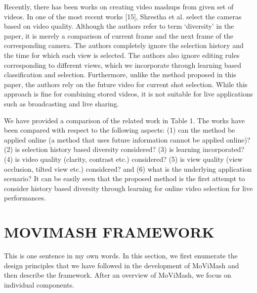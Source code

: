 \documentclass{clsfile}
\begin{document}
Recently, there has been works on creating video mashups from given set of videos. In one of the most recent works [15], Shrestha et al. select the cameras based on video quality. Although the authors refer to term ‘diversity’ in the paper, it is merely a comparison of current frame and the next frame of the corresponding camera. The authors completely ignore the selection history and the time for which each view is selected. The authors also ignore editing rules corresponding to different views, which we incorporate through learning based classification and selection. Furthermore, unlike the method proposed in this paper, the authors rely on the future video for current shot selection. While this approach is fine for combining stored videos, it is not suitable for live applications such as broadcasting and live sharing.

We have provided a comparison of the related work in Table 1.
The works have been compared with respect to the following aspects:
(1) can the method be applied online (a method that uses future
information cannot be applied online)? (2) is selection history based
diversity considered? (3) is learning incorporated? (4) is
video quality (clarity, contrast etc.) considered? (5) is view quality
(view occlusion, tilted view etc.) considered? and (6) what is the
underlying application scenario? It can be easily seen that the proposed
method is the first attempt to consider history based diversity
through learning for online video selection for live performances.

\section{MOVIMASH FRAMEWORK}
This is one sentence in my own words.
In this section, we first enumerate the design principles that we
have followed in the development of MoViMash and then describe
the framework. After an overview of MoViMash, we focus on individual
components.
\end{document}
